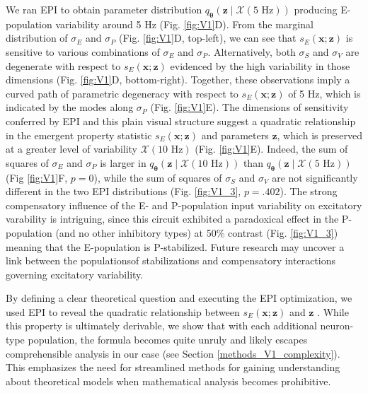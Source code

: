 \documentclass[11pt]{article}
\begin{document}
We ran EPI to obtain parameter distribution $q_{\bm{\theta}}(\mathbf{z} \mid \mathcal{X}(5\text{ Hz}))$ producing E-population variability around 5 Hz (Fig. \ref{fig:V1}D).
From the marginal distribution of $\sigma_E$ and $\sigma_P$ (Fig. \ref{fig:V1}D, top-left), we can see that $s_E(\mathbf{x}; \mathbf{z})$ is sensitive to various combinations of $\sigma_E$ and $\sigma_P$.
Alternatively, both $\sigma_S$ and $\sigma_V$ are degenerate with respect to $s_E(\mathbf{x}; \mathbf{z})$ evidenced by the high variability in those dimensions (Fig. \ref{fig:V1}D, bottom-right).
Together, these observations imply a curved path of parametric degeneracy with respect to $s_E(\mathbf{x}; \mathbf{z})$ of 5 Hz, which is indicated by the modes along $\sigma_P$ (Fig. \ref{fig:V1}E).
The dimensions of sensitivity conferred by EPI and this plain visual structure suggest a quadratic relationship in the emergent property statistic $s_E(\mathbf{x}; \mathbf{z})$ and parameters $\mathbf{z}$, which is preserved at a greater level of variability $\mathcal{X}(10\text{ Hz})$ (Fig. \ref{fig:V1}E).
Indeed, the sum of squares of $\sigma_E$ and $\sigma_P$ is larger in $q_{\bm{\theta}}(\mathbf{z} \mid \mathcal{X}(10\text{ Hz}))$ than $q_{\bm{\theta}}(\mathbf{z} \mid \mathcal{X}(5\text{ Hz}))$ (Fig \ref{fig:V1}F, $p=0$), while the sum of squares of $\sigma_S$ and $\sigma_V$ are not significantly different in the two EPI distributions (Fig. \ref{fig:V1_3}, $p=.402$).
The strong compensatory influence of the E- and P-population input variability on excitatory varability is intriguing, since this circuit exhibited a paradoxical effect in the P-population (and no other inhibitory types) at 50\% contrast (Fig. \ref{fig:V1_3}) meaning that the E-population is P-stabilized.
Future research may uncover a link between the populationsof stabilizations and compensatory interactions governing excitatory variability.

By defining a clear theoretical question and executing the EPI optimization, we used EPI to reveal the quadratic relationship between $s_E(\mathbf{x}; \mathbf{z})$ and $\mathbf{z}$ .
While this property is ultimately derivable, we show that with each additional neuron-type population, the formula becomes quite unruly and likely escapes comprehensible analysis in our case (see Section \ref{methods_V1_complexity}).
This emphasizes the need for streamlined methods for gaining understanding about theoretical models when mathematical analysis becomes prohibitive.


\end{document}

